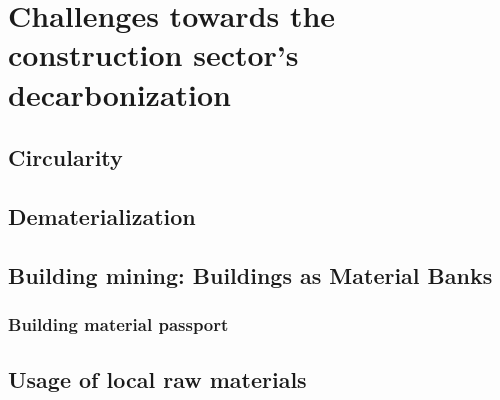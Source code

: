 \section[Challenges towards the construction sector's decarbonization]{Challenges towards the construction sector's decarbonization}
\label{sec:challenges_towards_the_construction_sector_decarbonization}

\subsection{Circularity}
\label{sec:circularity}


\subsection{Dematerialization}
\label{sec:dematerialization}

\subsection{Building mining: Buildings as Material Banks}
\label{sec:building_mining_buildings_material_banks}

\subsubsection{Building material passport}
\label{sec:building_material_passport}

\subsection{Usage of local raw materials}
\label{sec:usage_local_raw_materials}


